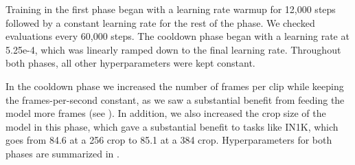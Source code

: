 \documentclass[]{kling/kling}
\begin{document}
Training in the first phase began with a learning rate warmup for 12,000 steps followed by a constant learning rate for the rest of the phase.
We checked evaluations every 60,000 steps.
The cooldown phase began with a learning rate at 5.25e-4, which was linearly ramped down to the final learning rate.
Throughout both phases, all other hyperparameters were kept constant.

In the cooldown phase we increased the number of frames per clip while keeping the frames-per-second constant, as we saw a substantial benefit from feeding the model more frames (see ).
In addition, we also increased the crop size of the model in this phase, which gave a substantial benefit to tasks like IN1K, which goes from 84.6 at a 256 crop to 85.1 at a 384 crop.
Hyperparameters for both phases are summarized in .
\end{document}
